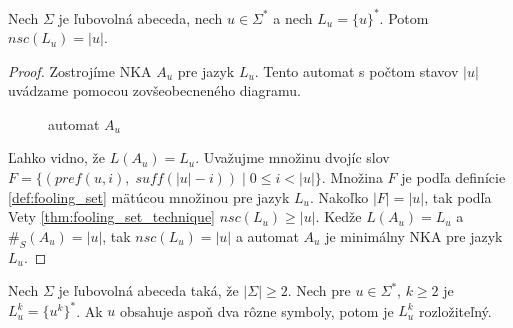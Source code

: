 \begin{lemma}
\label{lm:one_word_cycle_nsc}
Nech $ \Sigma $ je ľubovolná abeceda, nech $ u \in \Sigma^* $ a nech $ L_u = \lbrace u \rbrace^* $. Potom $ nsc(L_u) = |u| $.
\end{lemma}

\begin{proof}
Zostrojíme NKA $ A_u $ pre jazyk $ L_u $. Tento automat s počtom stavov $ |u| $ uvádzame pomocou zovšeobecneného diagramu.

\begin{figure}[H]
\centering
{}
\caption{automat $ A_u $}
\end{figure}
Ľahko vidno, že $ L(A_u) = L_u $. Uvažujme množinu dvojíc slov $ F = \lbrace (pref(u,i), \; suff(|u|-i)) \; | \; 0 \leq i < |u| \rbrace $. Množina $ F $ je podľa definície \ref{def:fooling_set} mätúcou množinou pre jazyk $ L_u $. Nakoľko $ |F|=|u| $, tak podľa Vety \ref{thm:fooling_set_technique} $ nsc(L_u) \geq |u| $. Kedže $ L(A_u) = L_u $ a $ \#_S(A_u) = |u| $, tak $ nsc(L_u) = |u| $ a automat $ A_u $ je minimálny NKA pre jazyk $ L_u $.
\end{proof}

\begin{proposition}
Nech $ \Sigma $ je ľubovolná abeceda taká, že $ |\Sigma| \geq 2 $. Nech pre $ u \in \Sigma^* $, $ k \geq 2 $ je $ L_u^k = \lbrace u^k \rbrace^* $. Ak $ u $ obsahuje aspoň dva rôzne symboly, potom je $ L_u^k $ rozložiteľný.
\end{proposition}

